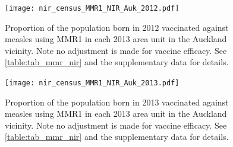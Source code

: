 \documentclass{article}
\begin{document}
\begin{figure}
\begin{center}
    \texttt{[image: nir\_census\_MMR1\_NIR\_Auk\_2012.pdf]}
 \end{center}
    \caption{Proportion of the population born in 2012 vaccinated against measles using MMR1 in each 2013 area unit in the Auckland vicinity. Note no adjustment is made for vaccine efficacy. See \autoref{table:tab_mmr_nir} and the supplementary data for details.}
\label{fig:fig12012_a}
\end{figure}


\begin{figure}
\begin{center}
    \texttt{[image: nir\_census\_MMR1\_NIR\_Auk\_2013.pdf]}
 \end{center}
    \caption{Proportion of the population born in 2013 vaccinated against measles using MMR1 in each 2013 area unit in the Auckland vicinity. Note no adjustment is made for vaccine efficacy. See \autoref{table:tab_mmr_nir} and the supplementary data for details.}
\label{fig:fig12013_a}
\end{figure}
\end{document}
